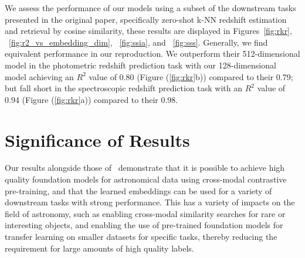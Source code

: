 \documentclass[a4paper,11pt]{article}
\begin{document}
We assess the performance of our models using a subset of the downstream tasks presented in the original paper, specifically
zero-shot k-NN redshift estimation and retrieval by cosine similarity, these results are displayed in Figures~\eqref{fig:rkr},
~\eqref{fig:r2_vs_embedding_dim}, ~\eqref{fig:ssia}, and ~\eqref{fig:sss}.
Generally, we find equivalent performance in our reproduction.
We outperform their 512-dimensional model in the photometric redshift prediction task with our 128-dimensional
model achieving an $R^{2}$ value of 0.80 (Figure (\ref{fig:rkr}b)) compared to their 0.79; but fall short in the spectroscopic
redshift prediction task with an $R^{2}$ value of 0.94 (Figure (\ref{fig:rkr}a)) compared to their 0.98.

\section{Significance of Results}\label{sec:conclusion}
Our results alongside those of~\cite{astroclip} demonstrate that it is possible to achieve high quality foundation
models for astronomical data using cross-modal contrastive pre-training, and that the learned embeddings can be used for a variety
of downstream tasks with strong performance.
This has a variety of impacts on the field of astronomy, such as enabling cross-modal similarity searches for rare or interesting
objects, and enabling the use of pre-trained foundation models for transfer learning on smaller datasets for specific tasks,
thereby reducing the requirement for large amounts of high quality labels.


\clearpage



\clearpage


\end{document}
